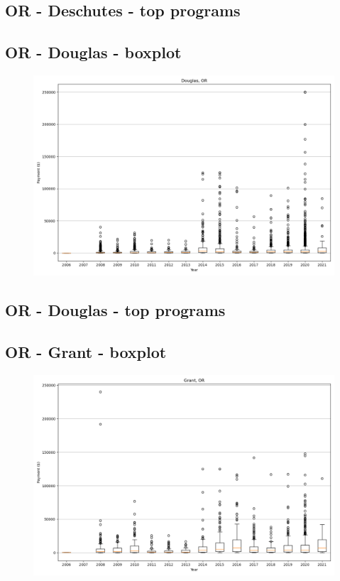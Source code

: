 \subsection*{OR - Deschutes - top programs}

\newpage
\subsection*{OR - Douglas - boxplot}
\begin{figure}[h]
\centering
\includegraphics[width=7in]{../output/boxplots/counties/Douglas-OR_boxplot.png}
\end{figure}


\subsection*{OR - Douglas - top programs}

\newpage
\subsection*{OR - Grant - boxplot}
\begin{figure}[h]
\centering
\includegraphics[width=7in]{../output/boxplots/counties/Grant-OR_boxplot.png}
\end{figure}


